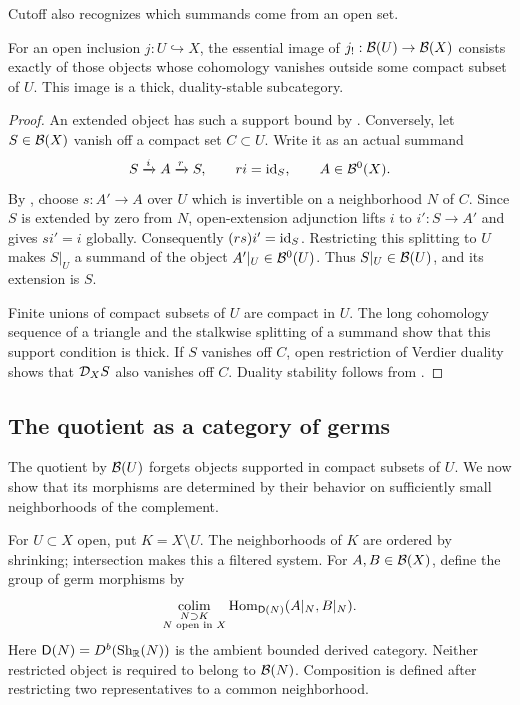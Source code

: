 Cutoff also recognizes which summands come from an open set.

\begin{proposition}
\label{prop:compact-support}
For an open inclusion $j:U\hookrightarrow X$, the essential image of
$j_!: \mathcal B(U)\to\mathcal B(X)$ consists exactly of those objects whose
cohomology vanishes outside some compact subset of $U$.  This image is
a thick, duality-stable subcategory.
\end{proposition}

\begin{proof}
An extended object has such a support bound by
.  Conversely, let $S\in\mathcal B(X)$ vanish
off a compact set $C\subset U$.  Write it as an actual summand
\[
 S\xrightarrow{i}A\xrightarrow{r}S,
 \qquad ri=\mathrm{id}_S,\qquad A\in\mathcal B^0(X).
\]
By , choose $s:A'\to A$ over $U$ which is invertible
on a neighborhood $N$ of $C$.  Since $S$ is extended by zero from $N$,
open-extension adjunction lifts $i$ to $i':S\to A'$ and gives
$si'=i$ globally.  Consequently $(rs)i'=\mathrm{id}_S$.
Restricting this splitting to $U$ makes $S|_U$ a summand of the object
$A'|_U\in\mathcal B^0(U)$.  Thus $S|_U\in\mathcal B(U)$, and its extension is $S$.

Finite unions of compact subsets of $U$ are compact in $U$.  The long
cohomology sequence of a triangle and the stalkwise splitting of a
summand show that this support condition is thick.  If $S$ vanishes
off $C$, open restriction of Verdier duality shows that $\mathcal D_X S$ also
vanishes off $C$.  Duality stability follows from
.
\end{proof}

\subsection{The quotient as a category of germs}

The quotient by $\mathcal B(U)$ forgets objects supported in compact subsets
of $U$.  We now show that its morphisms are determined by their
behavior on sufficiently small neighborhoods of the complement.

For $U\subset X$ open, put $K=X\setminus U$.  The neighborhoods of $K$
are ordered by shrinking; intersection makes this a filtered system.
For $A,B\in\mathcal B(X)$, define the group of germ morphisms by
\begin{equation}
\label{loc:eq-germs}
 \operatorname*{colim}_{\substack{N\supset K\\N\text{ open in }X}}
 \operatorname{Hom}_{\mathsf D(N)}(A|_N,B|_N).
\end{equation}
Here $\mathsf D(N)=D^b(\operatorname{Sh}_{\mathbb R}(N))$ is the ambient
bounded derived category.
Neither restricted object is required to belong to
$\mathcal B(N)$.  Composition is defined after restricting two representatives
to a common neighborhood.

